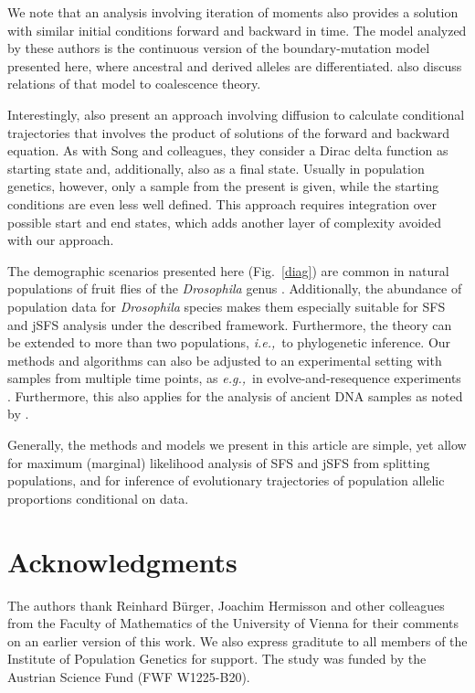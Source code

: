 \documentclass[preprint]{elsarticle}
\newcommand\eg{{\it e.g.,}}
\newcommand\ie{{\it i.e.,}}
\begin{document}
{We note that an analysis involving iteration of moments \citep{Evan07,Zivk11} also provides a solution with similar initial conditions forward and backward in time. The model analyzed by these authors is the continuous version of the  boundary-mutation model presented here, where ancestral and derived alleles are differentiated. %
\citet{Zivk11} also discuss relations of that model to coalescence theory.

Interestingly, \citet{Zhao13} also present an approach involving diffusion to calculate conditional trajectories that involves the product of solutions of the forward and backward equation. As with Song and colleagues, they consider a Dirac delta function as starting state and, additionally, also as a final state. Usually in population genetics, however, only a sample from the present is given, while the starting conditions are even less well defined. This approach requires integration over possible start and end states, which adds another layer of complexity avoided with our approach. 

The demographic scenarios presented here (Fig.~\ref{diag}) are common in natural populations of fruit flies of the \textit{Drosophila} genus \citep[\eg][]{Li06,Zeng10a,Pool12}. Additionally, the abundance of population data for \textit{Drosophila} species makes them especially suitable for SFS and jSFS analysis under the described framework. Furthermore, the theory can be extended to more than two populations, \ie\ to phylogenetic inference. Our methods and algorithms can also be adjusted to an experimental setting with samples from multiple time points, as \eg\ in evolve-and-resequence experiments \citep{Kofl14}. Furthermore, this also applies for the analysis of ancient DNA samples as noted by \citet{Stei14}.

Generally, the methods and models we present in this article are simple, yet allow for maximum (marginal) likelihood analysis of SFS and jSFS from splitting populations, and for inference of evolutionary trajectories of population allelic proportions conditional on data. 

\section*{Acknowledgments}

The authors thank Reinhard B\"urger, Joachim Hermisson and other colleagues from the Faculty of Mathematics of the University of Vienna for their comments on an earlier version of this work. We also express graditute to all members of the Institute of Population Genetics for support. The study was funded by the Austrian Science Fund (FWF W1225-B20). %

}
\end{document}
